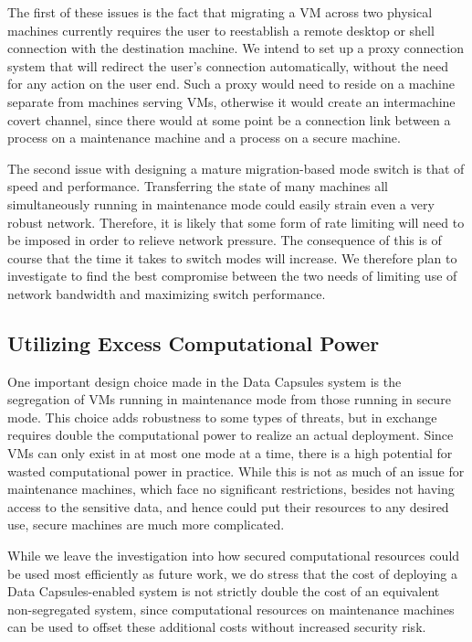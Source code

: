 \documentclass{acm_proc_article-sp}
\begin{document}
The first of these issues is the fact that migrating a VM across two physical
machines currently requires the user to reestablish a remote desktop or shell
connection with the destination machine.  We intend to set up a proxy connection
system that will redirect the user's connection automatically, without the need
for any action on the user end.  Such a proxy would need to reside on a machine
separate from machines serving VMs, otherwise it would create an intermachine
covert channel, since there would at some point be a connection link between a
process on a maintenance machine and a process on a secure machine.

The second issue with designing a mature migration-based mode switch is that of
speed and performance.  Transferring the state of many machines all
simultaneously running in maintenance mode could easily strain even a very
robust network.  Therefore, it is likely that some form of rate limiting will
need to be imposed in order to relieve network pressure.  The consequence of
this is of course that the time it takes to switch modes will increase.  We
therefore plan to investigate to find the best compromise between the two needs
of limiting use of network bandwidth and maximizing switch performance.

\subsection{Utilizing Excess Computational Power}

One important design choice made in the Data Capsules system is the segregation
of VMs running in maintenance mode from those running in secure mode.  This
choice adds robustness to some types of threats, but in exchange requires
double the computational power to realize an actual deployment.  Since VMs can
only exist in at most one mode at a time, there is a high potential for wasted
computational power in practice.  While this is not as much of an issue for
maintenance machines, which face no significant restrictions, besides not having
access to the sensitive data, and hence could put their resources to any
desired use, secure machines are much more complicated.

While we leave the investigation into how secured computational resources could
be used most efficiently as future work, we do stress that the cost of
deploying a Data Capsules-enabled system is not strictly double the cost of an
equivalent non-segregated system, since computational resources on maintenance
machines can be used to offset these additional costs without increased
security risk.
\end{document}
